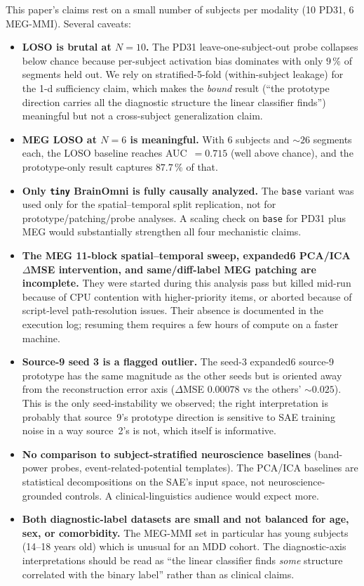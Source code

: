 \documentclass[11pt]{article}
\begin{document}
This paper's claims rest on a small number of subjects per modality
(10 PD31, 6 MEG-MMI). Several caveats:
\begin{itemize}
\item \textbf{LOSO is brutal at $N=10$.} The PD31 leave-one-subject-out probe
collapses below chance because per-subject activation bias dominates with
only $9\,\%$ of segments held out. We rely on stratified-5-fold
(within-subject leakage) for the 1-d sufficiency claim, which makes the
\emph{bound} result (``the prototype direction carries all the diagnostic
structure the linear classifier finds'') meaningful but not a cross-subject
generalization claim.
\item \textbf{MEG LOSO at $N=6$ is meaningful.} With 6 subjects and $\sim 26$
segments each, the LOSO baseline reaches AUC~$=0.715$ (well above chance),
and the prototype-only result captures $87.7\,\%$ of that.
\item \textbf{Only \texttt{tiny} BrainOmni is fully causally analyzed.} The
\texttt{base} variant was used only for the spatial--temporal split
replication, not for prototype/patching/probe analyses. A scaling check on
\texttt{base} for PD31 plus MEG would substantially strengthen all four
mechanistic claims.
\item \textbf{The MEG 11-block spatial--temporal sweep, expanded6 PCA/ICA
$\Delta$MSE intervention, and same/diff-label MEG patching are incomplete.}
They were started during this analysis pass but killed mid-run because of
CPU contention with higher-priority items, or aborted because of script-level
path-resolution issues. Their absence is documented in the execution log;
resuming them requires a few hours of compute on a faster machine.
\item \textbf{Source-9 seed 3 is a flagged outlier.} The seed-3 expanded6
source-9 prototype has the same magnitude as the other seeds but is oriented
away from the reconstruction error axis ($\Delta$MSE $0.00078$ vs the
others' $\sim 0.025$). This is the only seed-instability we observed; the
right interpretation is probably that source~9's prototype direction is
sensitive to SAE training noise in a way source~2's is not, which itself is
informative.
\item \textbf{No comparison to subject-stratified neuroscience baselines}
(band-power probes, event-related-potential templates). The PCA/ICA
baselines are statistical decompositions on the SAE's input space, not
neuroscience-grounded controls. A clinical-linguistics audience would expect
more.
\item \textbf{Both diagnostic-label datasets are small and not balanced for
age, sex, or comorbidity.} The MEG-MMI set in particular has young
subjects (14--18 years old) which is unusual for an MDD cohort. The
diagnostic-axis interpretations should be read as ``the linear classifier
finds \emph{some} structure correlated with the binary label'' rather than
as clinical claims.
\end{itemize}
\end{document}

